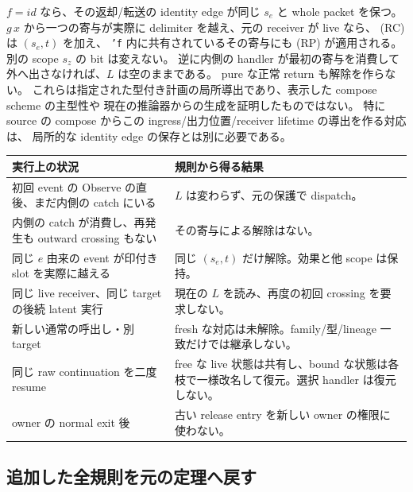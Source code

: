 \documentclass[11pt,a4paper]{article}
\begin{document}
\(f=id\) なら、その返却/転送の identity edge が同じ \(s_e\) と whole packet を保つ。
\(g\,x\) から一つの寄与が実際に delimiter を越え、元の receiver が live なら、
(RC) は \((s_e,t)\) を加え、
\texttt{'f} 内に共有されているその寄与にも (RP) が適用される。
別の scope \(s_z\) の bit は変えない。
逆に内側の handler が最初の寄与を消費して外へ出さなければ、\(L\) は空のままである。
pure な正常 return も解除を作らない。
これらは指定された型付き計画の局所導出であり、表示した compose scheme の主型性や
現在の推論器からの生成を証明したものではない。
特に source の compose からこの ingress/出力位置/receiver lifetime の導出を作る対応は、
局所的な identity edge の保存とは別に必要である。

\begin{longtable}{p{}p{}}
\toprule 実行上の状況 & 規則から得る結果 \\
\midrule\endhead
初回 event の Observe の直後、まだ内側の catch にいる & \(L\) は変わらず、元の保護で dispatch。\\
内側の catch が消費し、再発生も outward crossing もない & その寄与による解除はない。\\
同じ \(e\) 由来の event が印付き slot を実際に越える & 同じ \((s_e,t)\) だけ解除。効果と他 scope は保持。\\
同じ live receiver、同じ target の後続 latent 実行 & 現在の \(L\) を読み、再度の初回 crossing を要求しない。\\
新しい通常の呼出し・別 target & fresh な対応は未解除。family/型/lineage 一致だけでは継承しない。\\
同じ raw continuation を二度 resume & free な live 状態は共有し、bound な状態は各枝で一様改名して復元。選択 handler は復元しない。\\
owner の normal exit 後 & 古い release entry を新しい owner の権限に使わない。\\
\bottomrule
\end{longtable}

\subsection{追加した全規則を元の定理へ戻す}
\end{document}
